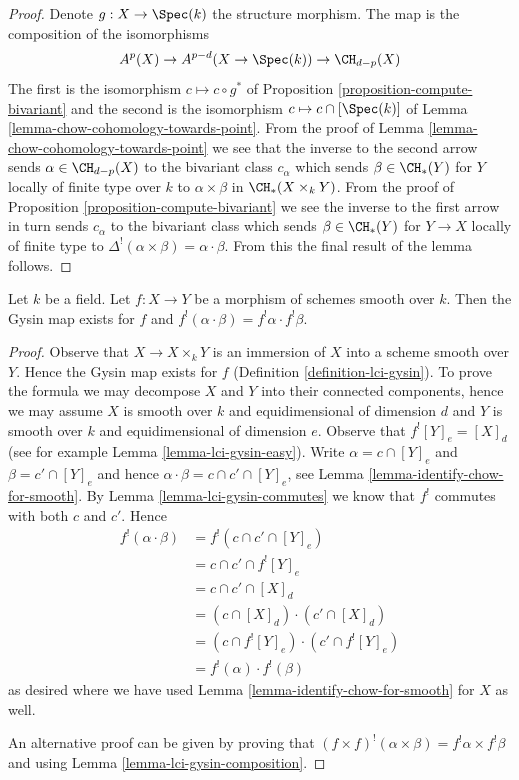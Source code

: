 \begin{proof}
Denote $g : X \to \Spec(k)$ the structure morphism.
The map is the composition of the isomorphisms
$$
A^p(X) \to A^{p - d}(X \to \Spec(k)) \to \CH_{d - p}(X)
$$
The first is the isomorphism $c \mapsto c \circ g^*$ of
Proposition \ref{proposition-compute-bivariant}
and the second is the isomorphism $c \mapsto c \cap [\Spec(k)]$ of
Lemma \ref{lemma-chow-cohomology-towards-point}.
From the proof of Lemma \ref{lemma-chow-cohomology-towards-point}
we see that the inverse to the second arrow sends $\alpha \in \CH_{d - p}(X)$
to the bivariant class $c_\alpha$ which sends $\beta \in \CH_*(Y)$
for $Y$ locally of finite type over $k$
to $\alpha \times \beta$ in $\CH_*(X \times_k Y)$. From the proof of
Proposition \ref{proposition-compute-bivariant} we see the inverse
to the first arrow in turn sends $c_\alpha$ to the bivariant class
which sends $\beta \in \CH_*(Y)$ for $Y \to X$ locally of finite type
to $\Delta^!(\alpha \times \beta) = \alpha \cdot \beta$.
From this the final result of the lemma follows.
\end{proof}

\begin{lemma}
\label{lemma-lci-gysin-product}
Let $k$ be a field. Let $f : X \to Y$ be a morphism of schemes smooth
over $k$. Then the Gysin map exists for $f$ and
$f^!(\alpha \cdot \beta) = f^!\alpha \cdot f^!\beta$.
\end{lemma}

\begin{proof}
Observe that $X \to X \times_k Y$ is an immersion of $X$ into a scheme
smooth over $Y$. Hence the Gysin map exists for $f$
(Definition \ref{definition-lci-gysin}).
To prove the formula we may decompose $X$ and $Y$ into their
connected components, hence we may assume $X$ is smooth over $k$
and equidimensional of dimension $d$ and $Y$ is smooth over $k$
and equidimensional of dimension $e$. Observe that
$f^![Y]_e = [X]_d$ (see for example Lemma \ref{lemma-lci-gysin-easy}).
Write $\alpha = c \cap [Y]_e$ and $\beta = c' \cap [Y]_e$
and hence $\alpha \cdot \beta = c \cap c' \cap [Y]_e$,
see Lemma \ref{lemma-identify-chow-for-smooth}.
By Lemma \ref{lemma-lci-gysin-commutes} we know that $f^!$
commutes with both $c$ and $c'$. Hence
\begin{align*}
f^!(\alpha \cdot \beta)
& =
f^!(c \cap c' \cap [Y]_e) \\
& =
c \cap c' \cap f^![Y]_e \\
& =
c \cap c' \cap [X]_d \\
& =
(c \cap [X]_d) \cdot (c' \cap [X]_d) \\
& =
(c \cap f^![Y]_e) \cdot (c' \cap f^![Y]_e) \\
& =
f^!(\alpha) \cdot f^!(\beta)
\end{align*}
as desired where we have used Lemma \ref{lemma-identify-chow-for-smooth}
for $X$ as well.

\medskip\noindent
An alternative proof can be given by proving that
$(f \times f)^!(\alpha \times \beta) = f^!\alpha \times f^!\beta$
and using Lemma \ref{lemma-lci-gysin-composition}.
\end{proof}

